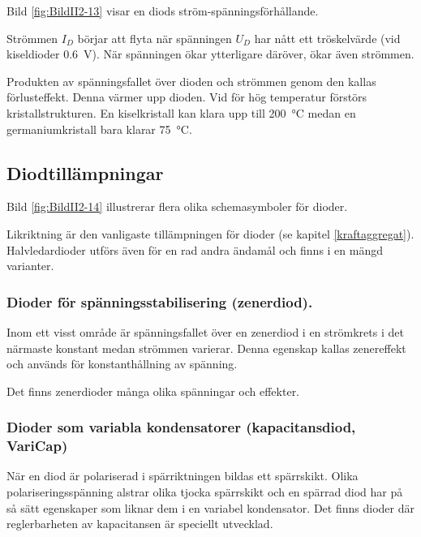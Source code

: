 Bild \ref{fig:BildII2-13} visar en diods ström-spänningsförhållande.

Strömmen \(I_D\) börjar att flyta när spänningen \(U_D\) har nått ett
tröskelvärde (vid kiseldioder \SI{0,6}{\volt}).
När spänningen ökar ytterligare däröver, ökar även strömmen.

Produkten av spänningsfallet över dioden och strömmen genom den kallas
förlusteffekt. Denna värmer upp dioden. Vid för hög temperatur förstörs
kristallstrukturen.
En kiselkristall kan klara upp till \SI{200}{\degreeCelsius} medan en
germaniumkristall bara klarar \SI{75}{\degreeCelsius}.

\subsection{Diodtillämpningar}

Bild \ref{fig:BildII2-14} illustrerar flera olika schemasymboler för
dioder.


\noindent
Likriktning är den vanligaste tillämpningen för dioder (se kapitel \ref{kraftaggregat}).
Halvledardioder utförs även för en rad andra ändamål och finns i en mängd
varianter.

\subsubsection{Dioder för spänningsstabilisering (zenerdiod).}
\label{diod_zener}

Inom ett visst område är spänningsfallet över en zenerdiod i en strömkrets
i det närmaste konstant medan strömmen varierar. Denna egenskap kallas
zenereffekt och används för konstanthållning av spänning.

Det finns zenerdioder många olika spänningar och effekter.

\subsubsection{Dioder som variabla kondensatorer (kapacitansdiod, VariCap)}
\label{varicap}

När en diod är polariserad i spärriktningen bildas ett spärrskikt.
Olika polariseringsspänning alstrar olika tjocka spärrskikt och en
spärrad diod har på så sätt egenskaper som liknar dem i en variabel
kondensator. Det finns dioder där reglerbarheten av kapacitansen är
speciellt utvecklad.

